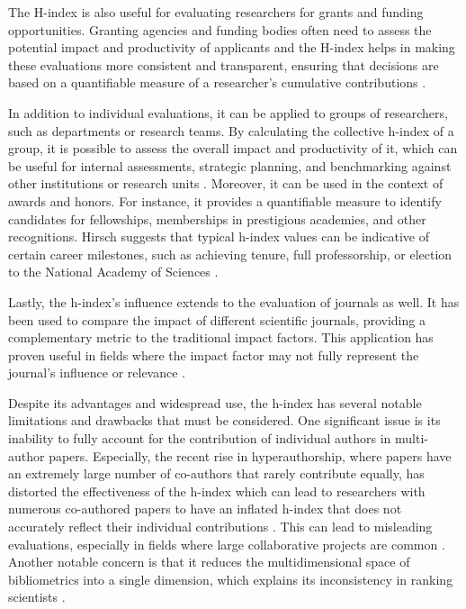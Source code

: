 The H-index is also useful for evaluating researchers for grants and funding
opportunities. Granting agencies and funding bodies often need to assess the
potential impact and productivity of applicants and the H-index helps in making
these evaluations more consistent and transparent, ensuring that decisions are
based on a quantifiable measure of a researcher's cumulative contributions
\cite{hirsch2005index,bornmann2007what,costas2007h,waltman2012inconsistency,hirsch2014meaning,koltun2021h}.

In addition to individual evaluations, it can be applied to groups of
researchers, such as departments or research teams. By calculating the
collective h-index of a group, it is possible to assess the overall impact and
productivity of it, which can be useful for internal assessments, strategic
planning, and benchmarking against other institutions or research units
\cite{hirsch2005index,bornmann2007what,costas2007h,waltman2012inconsistency,egghe2010hirsch,hirsch2014meaning,koltun2021h}.
Moreover, it can be used in the context of awards and honors. For instance, it
provides a quantifiable measure to identify candidates for fellowships,
memberships in prestigious academies, and other recognitions. Hirsch suggests
that typical h-index values can be indicative of certain career milestones,
such as achieving tenure, full professorship, or election to the National
Academy of Sciences
\cite{hirsch2005index,bornmann2007what,costas2007h,waltman2012inconsistency,egghe2010hirsch,hirsch2014meaning}.

Lastly, the h-index's influence extends to the evaluation of journals as well.
It has been used to compare the impact of different scientific journals,
providing a complementary metric to the traditional impact factors. This
application has proven useful in fields where the impact factor may not fully
represent the journal's influence or relevance \cite{norris2010h}.

Despite its advantages and widespread use, the h-index has several notable
limitations and drawbacks that must be considered. One significant issue is its
inability to fully account for the contribution of individual authors in
multi-author papers. Especially, the recent rise in hyperauthorship, where
papers have an extremely large number of co-authors that rarely contribute
equally, has distorted the effectiveness of the h-index which can lead to
researchers with numerous co-authored papers to have an inflated h-index that
does not accurately reflect their individual contributions
\cite{koltun2021h,bihari2018h}. This can lead to misleading evaluations,
especially in fields where large collaborative projects are common
\cite{hirsch2005index,bornmann2007what,costas2007h,waltman2012inconsistency,norris2010h,egghe2010hirsch,hirsch2014meaning}.
Another notable concern is that it reduces the multidimensional space of
bibliometrics into a single dimension, which explains its inconsistency in
ranking scientists \cite{bornmann2007what}.


